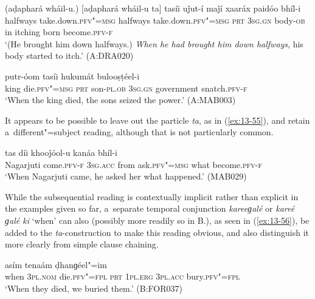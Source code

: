 \begin{exe}
\ex
\label{ex:13-53}
\gll (aḍaphará wháil-u.) [aḍaphará wháil-u ta] tasíi uǰut-í maǰí xaaráx paidóo bhíl-i \\
halfways take.down.\textsc{pfv"=msg} halfways  take.down.\textsc{pfv"=msg } \textsc{prt} \textsc{3sg.gn} body-\textsc{ob} in itching born become.\textsc{pfv-f} \\
\glt `(He brought him down halfways.) \textit{When he had brought him down halfways}, his body started to itch.' (A:DRA020)

\ex
\label{ex:13-54}
 putr-óom tasíi hukumát bulooṣṭéel-i \\
king die.\textsc{pfv"=msg} \textsc{prt} son-\textsc{pl.ob} \textsc{3sg.gn}  government snatch.\textsc{pfv-f} \\
\glt `When the king died, the sons seized the power.' (A:MAB003)
\end{exe}

It appears to be possible to leave out the particle \textit{ta}, as in (\ref{ex:13-55}), and retain a~different"=subject reading, although that is not particularly common.

\begin{exe}
\ex
\label{ex:13-55}
 tas díi khooǰóol-u kanáa bhíl-i \\
Nagarjuti come.\textsc{pfv-f} \textsc{3sg.acc} from ask.\textsc{pfv"=msg}  what become.\textsc{pfv-f} \\
\glt `When Nagarjuti came, he asked her what happened.' (MAB029) 
\end{exe}

While the subsequential reading is contextually implicit rather than explicit in the examples given so far, a~separate temporal conjunction \textit{kareeɡalé} or \textit{kareé ɡalé ki} `when' can also (possibly more readily so in B.), as seen in (\ref{ex:13-56}), be added to the \textit{ta}-construction to make this reading obvious, and also distinguish it more clearly from simple clause chaining.

\begin{exe}
\ex
\label{ex:13-56}
 asím tenaám ḍhanɡéel"=im \\
when \textsc{3pl.nom} die.\textsc{pfv"=fpl} \textsc{prt} \textsc{1pl.erg} \textsc{3pl.acc} bury.\textsc{pfv"=fpl} \\
\glt `When they died, we buried them.' (B:FOR037) 
\end{exe}

